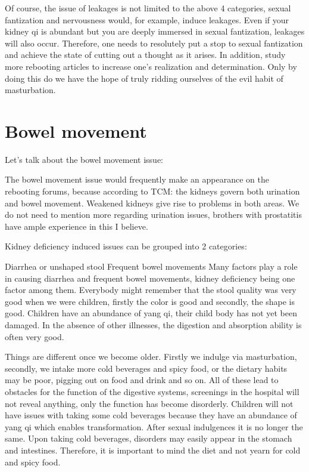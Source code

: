 \documentclass[
]{book}
\begin{document}
Of course, the issue of leakages is not limited to the above 4 categories, sexual fantization and nervousness would, for example, induce leakages. Even if your kidney qi is abundant but you are deeply immersed in sexual fantization, leakages will also occur. Therefore, one needs to resolutely put a stop to sexual fantization and achieve the state of cutting out a thought as it arises. In addition, study more rebooting articles to increase one's realization and determination. Only by doing this do we have the hope of truly ridding ourselves of the evil habit of masturbation.

\hypertarget{bowel-movement}{%
\section{Bowel movement}\label{bowel-movement}}

Let's talk about the bowel movement issue:

The bowel movement issue would frequently make an appearance on the rebooting forums, because according to TCM: the kidneys govern both urination and bowel movement. Weakened kidneys give rise to problems in both areas. We do not need to mention more regarding urination issues, brothers with prostatitis have ample experience in this I believe.

Kidney deficiency induced issues can be grouped into 2 categories:

Diarrhea or unshaped stool
Frequent bowel movements
Many factors play a role in causing diarrhea and frequent bowel movements, kidney deficiency being one factor among them. Everybody might remember that the stool quality was very good when we were children, firstly the color is good and secondly, the shape is good. Children have an abundance of yang qi, their child body has not yet been damaged. In the absence of other illnesses, the digestion and absorption ability is often very good.

Things are different once we become older. Firstly we indulge via masturbation, secondly, we intake more cold beverages and spicy food, or the dietary habits may be poor, pigging out on food and drink and so on. All of these lead to obstacles for the function of the digestive systems, screenings in the hospital will not reveal anything, only the function has become disorderly. Children will not have issues with taking some cold beverages because they have an abundance of yang qi which enables transformation. After sexual indulgences it is no longer the same. Upon taking cold beverages, disorders may easily appear in the stomach and intestines. Therefore, it is important to mind the diet and not yearn for cold and spicy food.
\end{document}
